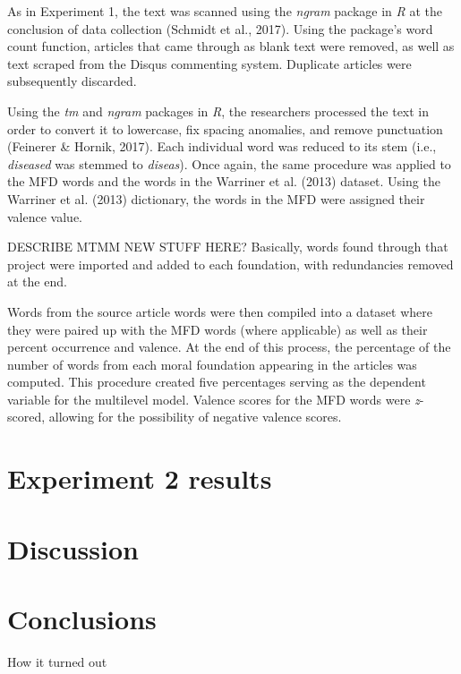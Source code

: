 \documentclass[,man]{apa6}
\begin{document}
As in Experiment 1, the text was scanned using the \emph{ngram} package in \emph{R} at the conclusion of data collection (Schmidt et al., 2017). Using the package's word count function, articles that came through as blank text were removed, as well as text scraped from the Disqus commenting system. Duplicate articles were subsequently discarded.

Using the \emph{tm} and \emph{ngram} packages in \emph{R}, the researchers processed the text in order to convert it to lowercase, fix spacing anomalies, and remove punctuation (Feinerer \& Hornik, 2017). Each individual word was reduced to its stem (i.e., \emph{diseased} was stemmed to \emph{diseas}). Once again, the same procedure was applied to the MFD words and the words in the Warriner et al. (2013) dataset. Using the Warriner et al. (2013) dictionary, the words in the MFD were assigned their valence value.

DESCRIBE MTMM NEW STUFF HERE? Basically, words found through that project were imported and added to each foundation, with redundancies removed at the end.

Words from the source article words were then compiled into a dataset where they were paired up with the MFD words (where applicable) as well as their percent occurrence and valence. At the end of this process, the percentage of the number of words from each moral foundation appearing in the articles was computed. This procedure created five percentages serving as the dependent variable for the multilevel model. Valence scores for the MFD words were \emph{z}-scored, allowing for the possibility of negative valence scores.

\hypertarget{experiment-2-results}{%
\section{Experiment 2 results}\label{experiment-2-results}}

\hypertarget{discussion-1}{%
\section{Discussion}\label{discussion-1}}

\hypertarget{conclusions}{%
\section{Conclusions}\label{conclusions}}

How it turned out
\end{document}

